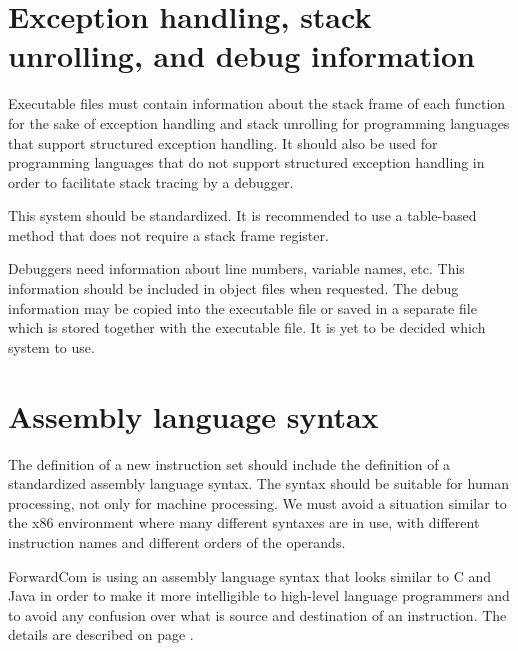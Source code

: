 \documentclass[forwardcom.tex]{subfiles}
\begin{document}
\section{Exception handling, stack unrolling, and debug information} \label{exceptionHandling}
Executable files must contain information about the stack frame of each function for the sake of exception handling and stack unrolling for programming languages that support structured exception handling. 
It should also be used for programming languages that do not support structured exception handling in order to facilitate stack tracing by a debugger. 
\vv

This system should be standardized.  
It is recommended to use a table-based method that does not require a stack frame register. 
\vv

Debuggers need information about line numbers, variable names, etc. This information should be included in object files when requested. The debug information may be copied into the executable file or saved in a separate file which is stored together with the executable file. It is yet to be decided which system to use. 


\section{Assembly language syntax} \label{StandardizationAssemblySyntax}
The definition of a new instruction set should include the definition of a standardized assembly language syntax. The syntax should be suitable for human processing, not only for machine processing. We must avoid a situation similar to the x86 environment where many different syntaxes are in use, with different instruction names and different orders of the operands. 
\vv

ForwardCom is using an assembly language syntax that looks similar to C and Java in order to make it more intelligible to high-level language programmers and to avoid any confusion over what is source and destination of an instruction. The details are described on page \pageref{AssemblyLanguageSyntax}.
\end{document}
